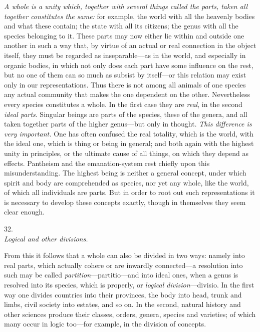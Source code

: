 \documentclass[12pt,a4paper]{article}
\newcommand{\logsec}[2]{%
  \bigskip\begin{center}{\large #1}\\[4pt]{\emph{#2}}\end{center}\smallskip}
\begin{document}
\noindent
\emph{A whole is a unity which, together with several things called the parts,
taken all together constitutes the same:}
for example, the world with all the heavenly bodies and what these contain; the
state with all its citizens; the genus with all the species belonging to it.
These parts may now either lie within and outside one another in such a way
that, by virtue of an actual or real connection in the object itself, they must
be regarded as inseparable---as in the world, and especially in organic bodies,
in which not only does each part have some influence on the rest, but no one of
them can so much as subsist by itself---or this relation may exist only in our
representations. Thus there is not among all animals of one species any actual
community that makes the one dependent on the other. Nevertheless every species
constitutes a whole. In the first case they are \emph{real}, in the second
\emph{ideal parts}. Singular beings are parts of the species, these of the
genera, and all taken together parts of the higher genus---but only in thought.
\emph{This difference is very important.} One has often confused the real
totality, which is the world, with the ideal one, which is thing or being in
general; and both again with the highest unity in principles, or the ultimate
cause of all things, on which they depend as effects. Pantheism and the
emanation-system rest chiefly upon this misunderstanding. The highest being is
neither a general concept, under which spirit and body are comprehended as
species, nor yet any whole, like the world, of which all individuals are parts.
But in order to root out such representations it is necessary
to develop these concepts exactly, though in themselves they seem clear enough.

\logsec{32.}{Logical and other divisions.}

\noindent
From this it follows that a whole can also be divided in two ways: namely into
real parts, which actually cohere or are inwardly connected---a resolution into
such may be called \emph{partition}---partitio---and into ideal ones, when a
genus is resolved into its species, which is properly, or \emph{logical
division}---divisio. In the first way one divides countries into their
provinces, the body into head, trunk and limbs, civil society into estates, and
so on. In the second, natural history and other sciences produce their classes,
orders, genera, species and varieties; of which many occur in logic too---for
example, in the division of concepts.
\end{document}
